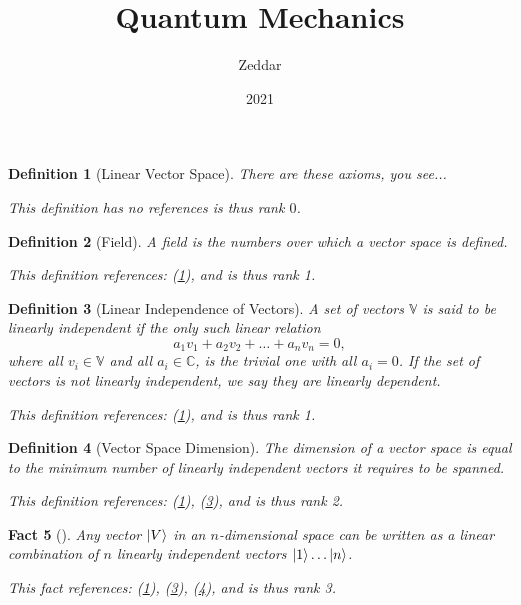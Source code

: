\documentclass{article}
\title{Quantum Mechanics}
\author{Zeddar}
\date{2021}
\newtheorem{definition}{Definition}
\newtheorem{fact}[definition]{Fact}
\begin{document}
\maketitle

\begin{tcolorbox}\begin{definition}[Linear Vector Space]\label{0}There are these axioms, you see...
 
 This definition has no references is thus rank $0$.\end{definition}\end{tcolorbox}
\begin{tcolorbox}\begin{definition}[Field]\label{1}A field is the numbers over which a vector space is defined.
 
 This definition references: (\ref{0}), and is thus rank 1.\end{definition}\end{tcolorbox}
\begin{tcolorbox}\begin{definition}[Linear Independence of Vectors]\label{2}A set of vectors $\mathbb{V}$ is said to be linearly independent if the only such
linear relation $$a_1v_1+a_2v_2+\ldots+a_nv_n=0,$$ where all $v_i\in\mathbb{V}$ and all
$a_i\in\mathbb{C}$, is the trivial one with all $a_i = 0$. If the set of vectors
is not linearly independent, we say they are linearly dependent. 
 
 This definition references: (\ref{0}), and is thus rank 1.\end{definition}\end{tcolorbox}
\begin{tcolorbox}\begin{definition}[Vector Space Dimension]\label{3}The dimension of a vector space is equal to the minimum number of linearly independent vectors it requires to be spanned.
 
 This definition references: (\ref{0}), (\ref{2}), and is thus rank 2.\end{definition}\end{tcolorbox}
\begin{tcolorbox}\begin{fact}[]\label{4}Any vector $\ket{V}$ in an $n$-dimensional space can be written as a
linear combination of $n$ linearly independent vectors $\ket{1}\ldots\ket{n}$.
 
 This fact references: (\ref{0}), (\ref{2}), (\ref{3}), and is thus rank 3.\end{fact}\end{tcolorbox}
\end{document}

